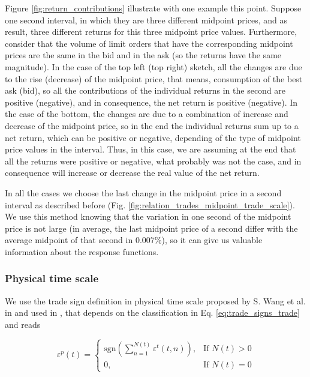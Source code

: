 Figure \ref{fig:return_contributions} illustrate with one example this point.
Suppose one second interval, in which they are three different midpoint prices,
and as result, three different returns for this three midpoint price
values. Furthermore, consider that the volume of limit orders that have the
corresponding midpoint prices are the same in the bid and in the ask (so the
returns have the same magnitude). In the case of the top left (top right)
sketch, all the changes are due to the rise (decrease) of the midpoint price,
that means, consumption of the best ask (bid), so all the contributions of the
individual returns in the second are positive (negative), and in consequence,
the net return is positive (negative). In the case of the bottom, the changes
are due to a combination of increase and decrease of the midpoint price, so in
the end the individual returns sum up to a net return, which can be positive or
negative, depending of the type of midpoint price values in the interval. Thus,
in this case, we are assuming at the end that all the returns were positive or
negative, what probably was not the case, and in consequence will increase or
decrease the real value of the net return.

In all the cases we choose the last change in the midpoint price in a second
interval as described before
(Fig. \ref{fig:relation_trades_midpoint_trade_scale}). We use this method
knowing that the variation in one second of the midpoint price is not large
(in average, the last midpoint price of a second differ with the average
midpoint of that second in $0.007\%$), so it can give us valuable information
about the response functions.

\subsubsection{Physical time scale}\label{subsubsec:physical_time}

We use the trade sign definition in physical time scale proposed by
S. Wang et al. in \cite{Wang_2016_cross} and used in
\cite{Wang_2017,Wang_2016_avg}, that depends on the classification in
Eq. \ref{eq:trade_signs_trade} and reads

\begin{equation}\label{eq:trade_signs_physical}
    \varepsilon^{p}\left(t\right)=\left\{
    \begin{array}{cc}
    \text{sgn}\left(\sum_{n=1}^{N\left(t\right)}\varepsilon^{t}
    \left(t,n\right)\right),
    & \text{If }N \left(t\right)>0\\
    0, & \text{If }N\left(t\right)=0
    \end{array}\right.
\end{equation}

